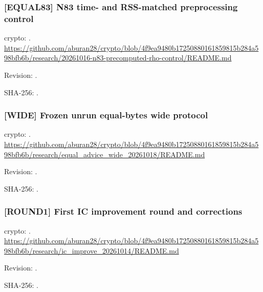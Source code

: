 \par\noindent\begin{minipage}{\linewidth}\small
\subsubsection*{[EQUAL83] N83 time- and RSS-matched preprocessing control}\label{art:EQUAL83}
crypto: .
\url{https://github.com/aburan28/crypto/blob/4f9ea9480b17250880161859815b284a598bfb6b/research/20261016-n83-precomputed-rho-control/README.md}
\par Revision: .
\par SHA-256: .
\end{minipage}\par\medskip

\par\noindent\begin{minipage}{\linewidth}\small
\subsubsection*{[WIDE] Frozen unrun equal-bytes wide protocol}\label{art:WIDE}
crypto: .
\url{https://github.com/aburan28/crypto/blob/4f9ea9480b17250880161859815b284a598bfb6b/research/equal_advice_wide_20261018/README.md}
\par Revision: .
\par SHA-256: .
\end{minipage}\par\medskip

\par\noindent\begin{minipage}{\linewidth}\small
\subsubsection*{[ROUND1] First IC improvement round and corrections}\label{art:ROUND1}
crypto: .
\url{https://github.com/aburan28/crypto/blob/4f9ea9480b17250880161859815b284a598bfb6b/research/ic_improve_20261014/README.md}
\par Revision: .
\par SHA-256: .
\end{minipage}\par\medskip

